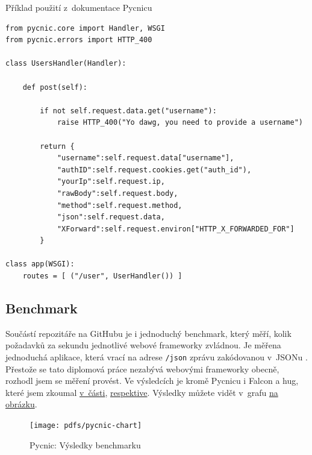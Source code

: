 \begin{listing}[htbp]
\caption{{\label{code:pycnic}Příklad použití z~dokumentace Pycnicu \autocite{pycnicpost}}}
\begin{verbatim}
from pycnic.core import Handler, WSGI
from pycnic.errors import HTTP_400

class UsersHandler(Handler):

    def post(self):

        if not self.request.data.get("username"):
            raise HTTP_400("Yo dawg, you need to provide a username")

        return {
            "username":self.request.data["username"],
            "authID":self.request.cookies.get("auth_id"),
            "yourIp":self.request.ip,
            "rawBody":self.request.body,
            "method":self.request.method,
            "json":self.request.data,
            "XForward":self.request.environ["HTTP_X_FORWARDED_FOR"]
        }

class app(WSGI):
    routes = [ ("/user", UserHandler()) ]
\end{verbatim}
\end{listing}

\subsection{Benchmark}\label{benchmark}

Součástí repozitáře na GitHubu je i jednoduchý benchmark, který měří, kolik požadavků za sekundu jednotlivé webové frameworky zvládnou. Je měřena jednoduchá aplikace, která vrací na adrese \verb!/json! zprávu zakódovanou v~JSONu \autocite{pycnicbench}. Přestože se tato diplomová práce nezabývá webovými frameworky obecně, rozhodl jsem se měření provést. Ve výsledcích je kromě Pycnicu i Falcon a hug, které jsem zkoumal \protect\hyperlink{falcon}{v~části}, \protect\hyperlink{hug}{respektive}. Výsledky můžete vidět v~grafu \protect\hyperlink{pic:pycnicbench}{na obrázku}.

\begin{figure}
\centering
\texttt{[image: pdfs/pycnic-chart]}
\caption{Pycnic: Výsledky benchmarku\label{pic:pycnicbench}}
\end{figure}
